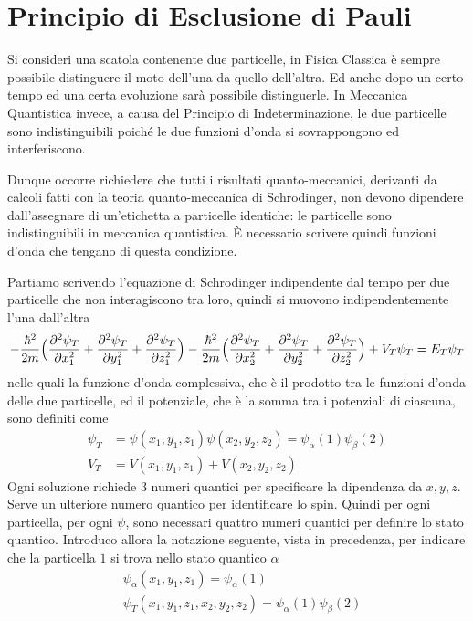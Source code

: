 
\section{Principio di Esclusione di Pauli}

Si consideri una scatola contenente due particelle, in Fisica Classica è sempre possibile distinguere il moto dell'una da quello dell'altra.
Ed anche dopo un certo tempo ed una certa evoluzione sarà possibile distinguerle.
In Meccanica Quantistica invece, a causa del Principio di Indeterminazione, le due particelle sono indistinguibili poiché le due funzioni d'onda si sovrappongono ed interferiscono.

Dunque occorre richiedere che tutti i risultati quanto-meccanici,
derivanti da calcoli fatti con la teoria quanto-meccanica di Schrodinger, non devono dipendere dall'assegnare di un'etichetta a particelle identiche: le particelle sono indistinguibili in meccanica quantistica.
È necessario scrivere quindi funzioni d'onda che tengano di questa condizione.

Partiamo scrivendo l'equazione di Schrodinger indipendente dal tempo per due particelle che non interagiscono tra loro, quindi si muovono indipendentemente l'una dall'altra
\begin{equation}
- \frac{\hbar^2}{2m} \Bigl(  \frac{\partial^2 \psi_T}{\partial x_1^2} + \frac{\partial^2 \psi_T}{\partial y_1^2} + \frac{\partial^2 \psi_T}{\partial z_1^2}  \Bigr) 
- \frac{\hbar^2}{2m} \Bigl(  \frac{\partial^2 \psi_T}{\partial x_2^2} + \frac{\partial^2 \psi_T}{\partial y_2^2} + \frac{\partial^2 \psi_T}{\partial z_2^2}  \Bigr) 
+ V_T \psi_T 
= E_T \psi_T
\end{equation}
nelle quali la funzione d'onda complessiva, che è il prodotto tra le funzioni d'onda delle due particelle, ed il potenziale, che è la somma tra i potenziali di ciascuna, sono definiti come
\begin{equation}
\begin{split}
\psi_T & = \psi(x_1, y_1, z_1) \psi(x_2, y_2, z_2) = \psi_\alpha(1) \psi_\beta(2) \\
V_T & = V(x_1, y_1, z_1) + V(x_2, y_2, z_2)
\end{split}
\end{equation}
Ogni soluzione richiede 3 numeri quantici per specificare la dipendenza da $x,y,z$.
Serve un ulteriore numero quantico per identificare lo spin.
Quindi per ogni particella, per ogni $\psi$, sono necessari quattro numeri quantici per definire lo stato quantico.
Introduco allora la notazione seguente, vista in precedenza, per indicare che la particella $1$ si trova nello stato quantico $\alpha$
\begin{equation}
\begin{split}
& \psi_{\alpha}(x_1,y_1,z_1) = \psi_{\alpha}(1) \\
& \psi_T(x_1, y_1, z_1,x_2, y_2, z_2) = \psi_\alpha(1) \psi_\beta(2)
\end{split}
\end{equation}

